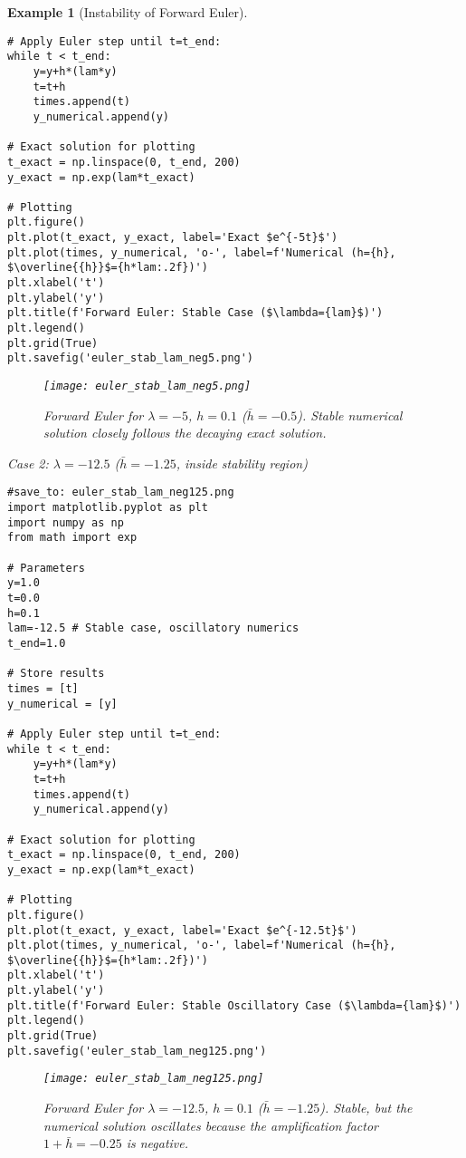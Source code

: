 \documentclass{article}
\newtheorem{example}{Example}
\begin{document}
\begin{example}[Instability of Forward Euler]
\begin{verbatim}
# Apply Euler step until t=t_end:
while t < t_end:
    y=y+h*(lam*y)
    t=t+h
    times.append(t)
    y_numerical.append(y)

# Exact solution for plotting
t_exact = np.linspace(0, t_end, 200)
y_exact = np.exp(lam*t_exact)

# Plotting
plt.figure()
plt.plot(t_exact, y_exact, label='Exact $e^{-5t}$')
plt.plot(times, y_numerical, 'o-', label=f'Numerical (h={h}, $\overline{{h}}$={h*lam:.2f})')
plt.xlabel('t')
plt.ylabel('y')
plt.title(f'Forward Euler: Stable Case ($\lambda={lam}$)')
plt.legend()
plt.grid(True)
plt.savefig('euler_stab_lam_neg5.png')
\end{verbatim}
\begin{figure}[h] \centering \texttt{[image: euler\_stab\_lam\_neg5.png]} \caption{Forward Euler for $\lambda=-5$, $h=0.1$ ($\bar{h}=-0.5$). Stable numerical solution closely follows the decaying exact solution.} \label{fig:euler_stab_lam_neg5} \end{figure}

\textit{Case 2: $\lambda = -12.5$ ($\bar{h} = -1.25$, inside stability region)}
\begin{verbatim}
#save_to: euler_stab_lam_neg125.png
import matplotlib.pyplot as plt
import numpy as np
from math import exp

# Parameters
y=1.0
t=0.0
h=0.1
lam=-12.5 # Stable case, oscillatory numerics
t_end=1.0

# Store results
times = [t]
y_numerical = [y]

# Apply Euler step until t=t_end:
while t < t_end:
    y=y+h*(lam*y)
    t=t+h
    times.append(t)
    y_numerical.append(y)

# Exact solution for plotting
t_exact = np.linspace(0, t_end, 200)
y_exact = np.exp(lam*t_exact)

# Plotting
plt.figure()
plt.plot(t_exact, y_exact, label='Exact $e^{-12.5t}$')
plt.plot(times, y_numerical, 'o-', label=f'Numerical (h={h}, $\overline{{h}}$={h*lam:.2f})')
plt.xlabel('t')
plt.ylabel('y')
plt.title(f'Forward Euler: Stable Oscillatory Case ($\lambda={lam}$)')
plt.legend()
plt.grid(True)
plt.savefig('euler_stab_lam_neg125.png')
\end{verbatim}
\begin{figure}[h] \centering \texttt{[image: euler\_stab\_lam\_neg125.png]} \caption{Forward Euler for $\lambda=-12.5$, $h=0.1$ ($\bar{h}=-1.25$). Stable, but the numerical solution oscillates because the amplification factor $1+\bar{h} = -0.25$ is negative.} \label{fig:euler_stab_lam_neg125} \end{figure}


\end{example}
\end{document}
